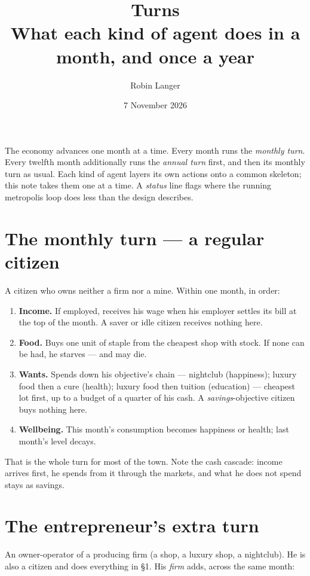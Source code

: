 \documentclass[11pt]{article}
\title{\textbf{Turns}\\[2pt]\large What each kind of agent does in a month, and once a year}
\author{Robin Langer}
\date{7 November 2026}
\begin{document}
\maketitle

The economy advances one month at a time. Every month runs the \emph{monthly
turn}. Every twelfth month additionally runs the \emph{annual turn} first, and
then its monthly turn as usual. Each kind of agent layers its own actions onto a
common skeleton; this note takes them one at a time. A \textit{status} line flags
where the running metropolis loop does less than the design describes.

\section{The monthly turn --- a regular citizen}

A citizen who owns neither a firm nor a mine. Within one month, in order:

\begin{enumerate}
\item \textbf{Income.} If employed, receives his wage when his employer settles
its bill at the top of the month. A saver or idle citizen receives nothing here.
\item \textbf{Food.} Buys one unit of staple from the cheapest shop with stock.
If none can be had, he starves --- and may die.
\item \textbf{Wants.} Spends down his objective's chain --- nightclub
(happiness); luxury food then a cure (health); luxury food then tuition
(education) --- cheapest lot first, up to a budget of a quarter of his cash. A
\emph{savings}-objective citizen buys nothing here.
\item \textbf{Wellbeing.} This month's consumption becomes happiness or health;
last month's level decays.
\end{enumerate}

That is the whole turn for most of the town. Note the cash cascade: income
arrives first, he spends from it through the markets, and what he does not spend
stays as savings.

\section{The entrepreneur's extra turn}

An owner-operator of a producing firm (a shop, a luxury shop, a nightclub). He is
also a citizen and does everything in \S1. His \emph{firm} adds, across the same
month:
\end{document}
